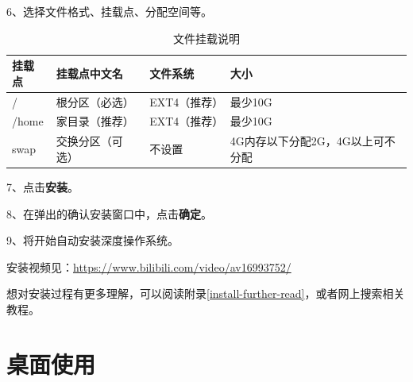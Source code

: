 \documentclass[doctor,openright,twoside]{sjtuthesis}
\theoremstyle{plain}
\theoremstyle{definition}
\theoremstyle{remark}
\theoremstyle{ocrenumbox}
\theoremstyle{plain}
\begin{document}
6、选择文件格式、挂载点、分配空间等。


\begin{longtable}{|L{1in}|L{1.2in}|L{1.2in}|L{1.9in}|}
\caption{\label{tab:mount}文件挂载说明} \\ \hline
\centerline{\textbf{挂载点}} & \centerline{\textbf{挂载点中文名}} & \centerline{\textbf{文件系统}} & \centerline{\textbf{大小}} \\
\hline
{}
/       &   根分区（必选）     &    EXT4（推荐）     &   最少10G \\
/home   &    家目录（推荐） &   EXT4（推荐）     &     最少10G \\
swap    &    交换分区（可选）&    不设置         &     4G内存以下分配2G，\newline 4G以上可不分配 \\
\hline
\end{longtable}

7、点击\textbf{安装}。

8、在弹出的确认安装窗口中，点击\textbf{确定}。

9、将开始自动安装深度操作系统。

安装视频见：\url{https://www.bilibili.com/video/av16993752/}

想对安装过程有更多理解，可以阅读附录\ref{install-further-read}，或者网上搜索相关教程。

\section{桌面使用}
\end{document}

